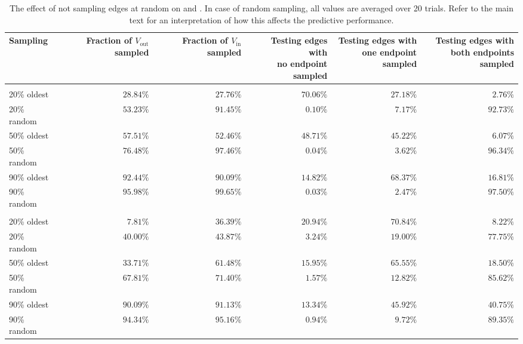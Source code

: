 \begin{table}[tbh]
  \centering
  \small
  \caption[The effect of not sampling edges at random]{
    The effect of not sampling edges at random on
  \wik{} and \epi{}. In case of random sampling, all values are averaged over 20 trials.
  Refer to the main text for an interpretation of how this affects the predictive performance.
\label{tab:troll_early_sampling}}
  \begin{tabular}{lrrrrr}
    \toprule
    Sampling &  \thead{Fraction of\\ $V_{\mathrm{out}}$ sampled} &
    \thead{Fraction of\\ $V_{\mathrm{in}}$ sampled} &
    \thead{Testing edges with\\ no endpoint sampled} &
    \thead{Testing edges with\\ one endpoint sampled} &
    \thead{Testing edges with\\ both endpoints sampled} \\
    \midrule
    & \multicolumn{5}{c}{\wik{}} \\
    \cmidrule(lr){2-6}
    20\% oldest & $28.84\%$ & $27.76\%$ & $70.06\%$ & $27.18\%$ & $2.76\%$  \\
    20\% random & $53.23\%$ & $91.45\%$ & $0.10\%$  & $7.17\%$  & $92.73\%$ \\
    \midrule
    50\% oldest & $57.51\%$ & $52.46\%$ & $48.71\%$ & $45.22\%$ & $6.07\%$  \\
    50\% random & $76.48\%$ & $97.46\%$ & $0.04\%$  & $3.62\%$  & $96.34\%$ \\
    \midrule
    90\% oldest & $92.44\%$ & $90.09\%$ & $14.82\%$ & $68.37\%$ & $16.81\%$ \\
    90\% random & $95.98\%$ & $99.65\%$ & $0.03\%$  & $2.47\%$  & $97.50\%$ \\
    & \multicolumn{5}{c}{\epi{}} \\
    \cmidrule(lr){2-6}
    20\% oldest & $7.81\%$  & $36.39\%$ & $20.94\%$ & $70.84\%$ & $8.22\%$  \\
    20\% random & $40.00\%$ & $43.87\%$ & $3.24\%$  & $19.00\%$ & $77.75\%$ \\
    \midrule
    50\% oldest & $33.71\%$ & $61.48\%$ & $15.95\%$ & $65.55\%$ & $18.50\%$ \\
    50\% random & $67.81\%$ & $71.40\%$ & $1.57\%$  & $12.82\%$ & $85.62\%$ \\
    \midrule
    90\% oldest & $90.09\%$ & $91.13\%$ & $13.34\%$ & $45.92\%$ & $40.75\%$ \\
    90\% random & $94.34\%$ & $95.16\%$ & $0.94\%$  & $9.72\%$  & $89.35\%$ \\
    \bottomrule
  \end{tabular}
\end{table}
